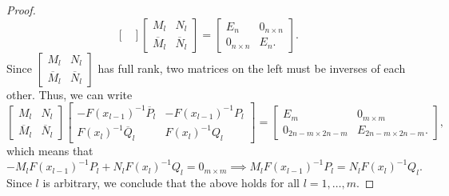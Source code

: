 \documentclass[11pt,reqno,oneside,a4paper]{article}
\theoremstyle{plain} %
\theoremstyle{definition}
\theoremstyle{remark}
\begin{document}
\begin{proof}
\[\begin{bmatrix}
\end{bmatrix}
\begin{bmatrix}
M_l & N_l \\
\overline{M}_l & \overline{N}_l
\end{bmatrix} = 
\begin{bmatrix}
E_n & 0_{n\times n} \\
0_{n\times n} & E_n.
\end{bmatrix}.
\]
Since $\begin{bmatrix}
M_l & N_l \\
\overline{M}_l & \overline{N}_l
\end{bmatrix}$ has full rank, two matrices on the left must be inverses of each other. Thus, we can write
\[ 
\begin{bmatrix}
M_l & N_l \\
\overline{M}_l & \overline{N}_l
\end{bmatrix} 
\begin{bmatrix}
- F(x_{l-1})^{-1} \overline{P}_l & - F(x_{l-1})^{-1} P_l \\
F(x_l)^{-1}\overline{Q}_l & F(x_l)^{-1}Q_l
\end{bmatrix}
= 
\begin{bmatrix}
E_m & 0_{m\times m} \\
0_{2n-m\times 2n-m} & E_{2n-m\times 2n-m} .
\end{bmatrix},
\] 
which means that 
\[ 
-  M_l  F(x_{l-1})^{-1} P_l + N_l F(x_l)^{-1}Q_l   =  0_{m\times m} \implies M_l  F(x_{l-1})^{-1} P_l = N_l F(x_l)^{-1}Q_l.
\]
Since $l$ is arbitrary, we conclude that the above holds for all $l = 1, \ldots, m.$
\end{proof}



\end{document}
